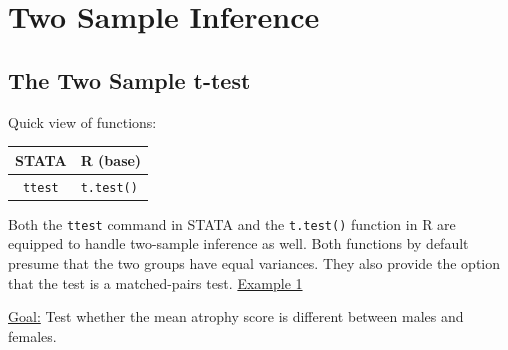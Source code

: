 \documentclass[landscape]{article}
\begin{document}
\section{Two Sample Inference}
\subsection{The Two Sample t-test}
Quick view of functions:\\
\begin{tabular}{c|l}
STATA & R (base) \\
\hline
\texttt{ttest} & \texttt{t.test()}
\end{tabular}

Both the \texttt{ttest} command in STATA and the \texttt{t.test()} function in R are equipped to handle two-sample inference as well. Both functions by default presume that the two groups have equal variances. They also provide the option that the test is a matched-pairs test.
\newline
\noindent \underline{Example 1}

\underline{Goal:} Test whether the mean atrophy score is different between males and females.
\end{document}
